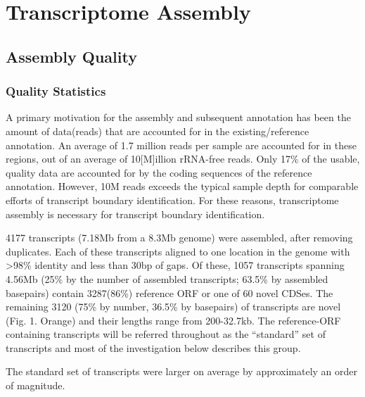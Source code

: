 

\chapter{Transcriptome Assembly}

\section{Assembly Quality}

\subsection{Quality Statistics}


A primary motivation for the assembly and subsequent annotation has been the amount of data(reads) that are accounted for in the existing/reference annotation. An average of 1.7 million reads per sample are accounted for in these regions, out of an average of 10[M]illion rRNA-free reads.  Only 17\% of the usable, quality data are accounted for by the coding sequences of the reference annotation. However, 10M reads exceeds the typical sample depth for comparable efforts of transcript boundary identification. For these reasons, transcriptome assembly is necessary for transcript boundary identification.

4177 transcripts (7.18Mb from a 8.3Mb genome) were assembled, after removing duplicates. Each of these transcripts aligned to one location in the genome with \textgreater 98\% identity and less than 30bp of gaps. Of these, 1057 transcripts spanning 4.56Mb (25\% by the number of assembled transcripts;  63.5\% by assembled basepairs) contain 3287(86\%) reference ORF or one of 60 novel CDSes.  The remaining 3120 (75\% by number, 36.5\% by basepairs) of transcripts are novel (Fig. 1. Orange) and their lengths range from 200-32.7kb. The reference-ORF containing transcripts will be referred throughout as the ``standard'' set of transcripts and most of the investigation below describes this group.

The standard set of transcripts were larger on average by approximately an order of magnitude.


